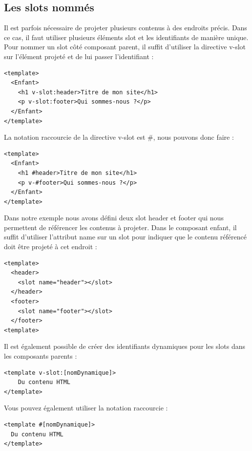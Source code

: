 \subsection{Les {\color{monOrange}slots} nommés}
Il est parfois nécessaire de projeter plusieurs contenus à des endroits précis. Dans ce cas, il faut utiliser plusieurs éléments {\color{monOrange}slot} et les identifiants de manière unique. Pour nommer un {\color{monOrange}slot} côté composant parent, il suffit d'utiliser la directive {\color{monOrange}v-slot} sur l'élément projeté et de lui passer l'identifiant :
\begin{verbatim}
<template>
  <Enfant>
    <h1 v-slot:header>Titre de mon site</h1>
    <p v-slot:footer>Qui sommes-nous ?</p>
  </Enfant>
</template>
\end{verbatim}
La notation raccourcie de la directive {\color{monOrange}v-slot} est {\color{monOrange}\#}, nous pouvons donc faire :
\begin{verbatim}
<template>
  <Enfant>
    <h1 #header>Titre de mon site</h1>
    <p v-#footer>Qui sommes-nous ?</p>
  </Enfant>
</template>
\end{verbatim}
Dans notre exemple nous avons défini deux {\color{monOrange}slot header} et {\color{monOrange}footer} qui nous permettent de référencer les contenus à projeter. Dans le composant enfant, il suffit d'utiliser l'attribut {\color{monOrange}name} sur un {\color{monOrange}slot} pour indiquer que le contenu référencé doit être projeté à cet endroit :
\begin{verbatim}
<template>
  <header>
    <slot name="header"></slot>
  </header>
  <footer>
    <slot name="footer"></slot>
  </footer>
<template>
\end{verbatim}
Il est également possible de créer des identifiants dynamiques pour les {\color{monOrange}slots} dans les composants parents :
\begin{verbatim}
<template v-slot:[nomDynamique]>
    Du contenu HTML
</template>
\end{verbatim}
Vous pouvez également utiliser la notation raccourcie :
\begin{verbatim}
<template #[nomDynamique]>
  Du contenu HTML
</template>
\end{verbatim}
